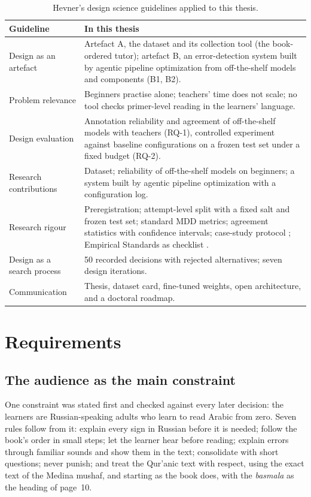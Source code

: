 \begin{table}[ht]
\centering\small
\caption{Hevner's design science guidelines \cite{SRC-100} applied to this thesis.}
\label{tab:hevner}
\begin{tabularx}{\linewidth}{@{}P{3.6cm}L@{}}
\toprule
Guideline & In this thesis \\
\midrule
Design as an artefact & Artefact A, the dataset and its collection tool (the book-ordered tutor); artefact
B, an error-detection system built by agentic pipeline optimization from off-the-shelf models and components (B1, B2). \\
Problem relevance & Beginners practise alone; teachers' time does not scale; no tool checks primer-level
reading in the learners' language. \\
Design evaluation & Annotation reliability and agreement of off-the-shelf models with teachers (RQ-1),
controlled experiment against baseline configurations on a frozen test set under a fixed budget (RQ-2). \\
Research contributions & Dataset; reliability of off-the-shelf models on beginners; a system built by agentic pipeline optimization with a configuration log. \\
Research rigour & Preregistration; attempt-level split with a fixed salt and frozen test set; standard MDD metrics; agreement statistics with confidence intervals;
case-study protocol \cite{SRC-102}; Empirical Standards as checklist \cite{SRC-103}. \\
Design as a search process & 50 recorded decisions with rejected alternatives; seven design iterations. \\
Communication & Thesis, dataset card, fine-tuned weights, open architecture, and a doctoral roadmap. \\
\bottomrule
\end{tabularx}
\end{table}

\section{Requirements}\label{sec:method-req}

\subsection{The audience as the main constraint}

One constraint was stated first and checked against every later decision: the learners are
Russian-speaking adults who learn to read Arabic from zero. Seven rules follow from it: explain every sign
in Russian before it is needed; follow the book's order in small steps; let the learner hear before
reading; explain errors through familiar sounds and show them in the text; consolidate with short
questions; never punish; and treat the Qur'anic text with respect, using the exact text of the Medina
mushaf, and starting as the book does, with the \emph{basmala} as the heading of page~10.

